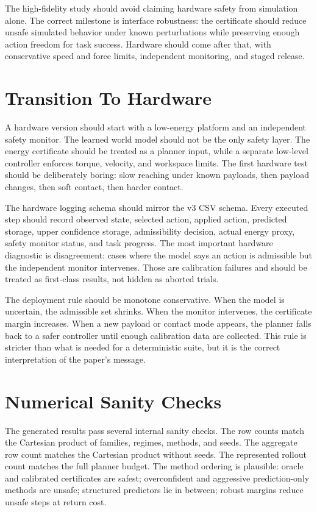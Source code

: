 \documentclass{article}
\begin{document}
The high-fidelity study should avoid claiming hardware safety from simulation alone. The correct milestone is interface robustness: the certificate should reduce unsafe simulated behavior under known perturbations while preserving enough action freedom for task success. Hardware should come after that, with conservative speed and force limits, independent monitoring, and staged release.

\section{Transition To Hardware}

A hardware version should start with a low-energy platform and an independent safety monitor. The learned world model should not be the only safety layer. The energy certificate should be treated as a planner input, while a separate low-level controller enforces torque, velocity, and workspace limits. The first hardware test should be deliberately boring: slow reaching under known payloads, then payload changes, then soft contact, then harder contact.

The hardware logging schema should mirror the v3 CSV schema. Every executed step should record observed state, selected action, applied action, predicted storage, upper confidence storage, admissibility decision, actual energy proxy, safety monitor status, and task progress. The most important hardware diagnostic is disagreement: cases where the model says an action is admissible but the independent monitor intervenes. Those are calibration failures and should be treated as first-class results, not hidden as aborted trials.

The deployment rule should be monotone conservative. When the model is uncertain, the admissible set shrinks. When the monitor intervenes, the certificate margin increases. When a new payload or contact mode appears, the planner falls back to a safer controller until enough calibration data are collected. This rule is stricter than what is needed for a deterministic suite, but it is the correct interpretation of the paper's message.

\clearpage
\section{Numerical Sanity Checks}

The generated results pass several internal sanity checks. The row counts match the Cartesian product of families, regimes, methods, and seeds. The aggregate row count matches the Cartesian product without seeds. The represented rollout count matches the full planner budget. The method ordering is plausible: oracle and calibrated certificates are safest; overconfident and aggressive prediction-only methods are unsafe; structured predictors lie in between; robust margins reduce unsafe steps at return cost.
\end{document}
